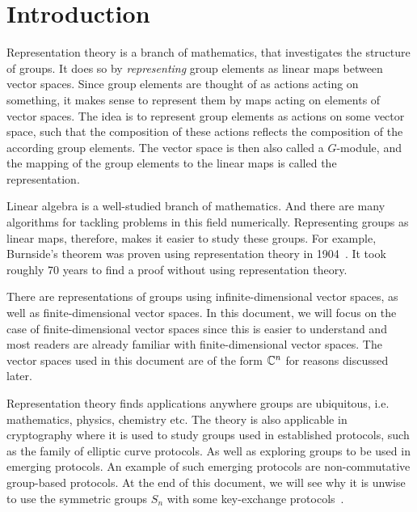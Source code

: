\section{Introduction}

Representation theory is a branch of mathematics, that investigates the structure of groups.
It does so by \textit{representing} group elements as linear maps between vector spaces.
Since group elements are thought of as actions acting on something, it makes sense to represent them by maps acting on elements of vector spaces.
The idea is to represent group elements as actions on some vector space, such that the composition of these actions reflects the composition of the according group elements.
The vector space is then also called a $G$-module, and the mapping of the group elements to the linear maps is called the representation.

Linear algebra is a well-studied branch of mathematics.
And there are many algorithms for tackling problems in this field numerically.
Representing groups as linear maps, therefore, makes it easier to study these groups.
For example, Burnside's theorem was proven using representation theory in 1904~\cite{burnside1904groups}.
It took roughly 70 years to find a proof without using representation theory.

There are representations of groups using infinite-dimensional vector spaces, as well as finite-dimensional vector spaces.
In this document, we will focus on the case of finite-dimensional vector spaces since this is easier to understand and most readers are already familiar with finite-dimensional vector spaces.
The vector spaces used in this document are of the form $\mathbb{C}^n$ for reasons discussed later.

Representation theory finds applications anywhere groups are ubiquitous, i.e. mathematics, physics, chemistry etc.
The theory is also applicable in cryptography where it is used to study groups used in established protocols, such as the family of elliptic curve protocols.
As well as exploring groups to be used in emerging protocols.
An example of such emerging protocols are non-commutative group-based protocols.
At the end of this document, we will see why it is unwise to use the symmetric groups $S_n$ with some key-exchange protocols~\cite{khovanov2022monoidal}.
